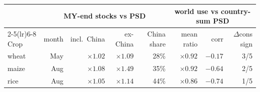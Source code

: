 \begin{tabular}{l rrrr rrr}
\toprule
 & \multicolumn{4}{c}{MY-end stocks vs PSD} & \multicolumn{3}{c}{world use vs country-sum PSD} \\
\cmidrule(lr){2-5}\cmidrule(lr){6-8}
Crop & month & incl.\ China & ex-China & China share & mean ratio & corr & $\Delta$cons sign \\
\midrule
wheat & May & $\times 1.02$ & $\times 1.09$ & 28\% & $\times 0.92$ & $-0.17$ & 3/5 \\
maize & Aug & $\times 1.08$ & $\times 1.49$ & 35\% & $\times 0.92$ & $-0.64$ & 2/5 \\
rice  & Aug & $\times 1.05$ & $\times 1.14$ & 44\% & $\times 0.86$ & $-0.74$ & 1/5 \\
\bottomrule
\end{tabular}
